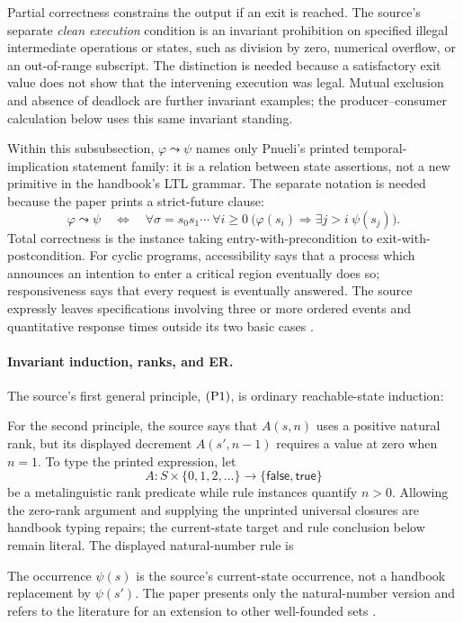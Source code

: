 Partial correctness constrains the output if an exit is reached.  The source's
separate \emph{clean execution} condition is an invariant prohibition on
specified illegal intermediate operations or states, such as division by
zero, numerical overflow, or an out-of-range subscript.  The distinction is
needed because a satisfactory exit value does not show that the intervening
execution was legal.  Mutual exclusion and absence of deadlock are further
invariant examples; the producer--consumer calculation below uses this same
invariant standing.

Within this subsubsection, \(\varphi\leadsto\psi\) names only Pnueli's printed
temporal-implication statement family: it is a relation between state
assertions, not a new primitive in the handbook's LTL grammar.  The separate
notation is needed because the paper prints a strict-future clause:
\[
 \varphi\leadsto\psi
 \quad\Longleftrightarrow\quad
 \forall\sigma=s_0s_1\cdots\ \forall i\ge0\
 \bigl(\varphi(s_i)\Rightarrow
       \exists j>i\ \psi(s_j)\bigr).
\]
Total correctness is the instance taking entry-with-precondition to
exit-with-postcondition.  For cyclic programs, accessibility says that a
process which announces an intention to enter a critical region eventually
does so; responsiveness says that every request is eventually answered.
The source expressly leaves specifications involving three or more ordered
events and quantitative response times outside its two basic cases
\cite[pp.~48--49]{Pnueli1977}.

\paragraph{Invariant induction, ranks, and ER.}
The source's first general principle, \(({\rm P1})\), is ordinary
reachable-state induction:
\par\noindent
\begin{minipage}{\linewidth}
\end{minipage}
\par
For the second principle, the source says that \(A(s,n)\) uses a positive
natural rank, but its displayed decrement \(A(s',n-1)\) requires a value at
zero when \(n=1\).  To type the printed expression, let
\[
 A:S\times\{0,1,2,\ldots\}
   \longrightarrow\{\mathsf{false},\mathsf{true}\}
\]
be a metalinguistic rank predicate while rule instances quantify \(n>0\).
Allowing the zero-rank argument and supplying the unprinted universal closures
are handbook typing repairs; the current-state target and rule conclusion below
remain literal.  The displayed natural-number rule is
\par\noindent
\begin{minipage}{\linewidth}
\end{minipage}
\par
The occurrence \(\psi(s)\) is the source's current-state occurrence, not a
handbook replacement by \(\psi(s')\).  The paper presents only the
natural-number version and refers to the literature for an extension to other
well-founded sets \cite[p.~49]{Pnueli1977}.

